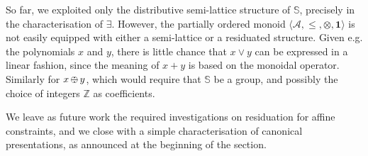 \documentclass{llncs}
\newcommand{\comment}[1]{}
\def\monid{{\mathbf 0}}
\def\1{{\mathbf 1}}
\def\monop{\otimes}
\def\odiv{\, {\ominus\hspace{-7.7pt} \div} \,}
\def\monid{\mathbf{1}}
\begin{document}
So far, we exploited only the distributive semi-lattice structure of $\mathbb{S}$, precisely in the characterisation of $\exists$.
%
However, the partially ordered monoid $\langle \mathcal{A}, \leq, \monop, \monid \rangle$ is not easily equipped with either a semi-lattice or a residuated structure.
%
Given e.g. the polynomials $x$ and $y$, there is little chance that $x \vee y$ can be expressed in a linear fashion, since the meaning of $x + y$ is based
on the monoidal operator. 
%
Similarly for $x \odiv y$, which would require that  $\mathbb{S}$ be a group, and possibly the choice of integers $\mathbb{Z}$ as coefficients.

\smallskip
We leave as future work the required investigations on residuation for affine constraints, and we close with a simple characterisation 
of canonical presentations, as announced at the beginning of the section.

%
\comment{
In order to understand under which conditions, we first
investigate the order.

\begin{lemma}
Let $c_1$, $c_2$ be affine constraints
such that $c_1 \leq c_2$.
If $\1 \in D$, then $i_{c_1} \leq i_{c_2}$.
\end{lemma}
\begin{proof}
Consider the maximal presentations of $c_1$ and $c_2$, $\langle p_{c_1}, i_{c_2} \rangle$ and $\langle p_{c_2}, i_{c_2} \rangle$. Then
\[ c_1 \leq c_2 \iff \langle p_{c_1}, i_{c_1} \rangle \leq \langle p_{c_2}, i_{c_2} \rangle \]
\[ \implies \forall \eta. \bigotimes_{x \in V} \eta(x)^{p_{c_1}(x)} \otimes i_{c_1} \leq \bigotimes_{x \in V} \eta(x)^{p_{c_2}(x)} \otimes i_{c_2} \]
\[ \implies \bigotimes_{x \in V} \monid^{p_{c_1}(x)} \otimes i_{c_1} \leq \bigotimes_{x \in V} \monid^{p_{c_2}(x)} \otimes i_{c_2} \]
\[ \implies i_{c_1} \leq i_{c_2} \]
\qed
\end{proof}
}
\end{document}
